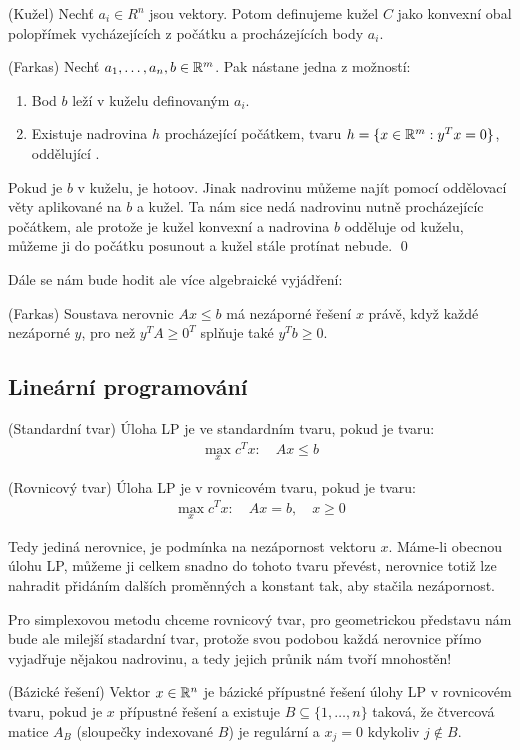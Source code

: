 \df (Kužel) Nechť $a_i\in R^n$ jsou vektory. Potom definujeme kužel $C$ jako
konvexní obal polopřímek vycházejících z počátku a procházejících body $a_i$.

\lm (Farkas) Nechť $a_1, \dots, a_n, b \in \mathbb{R}^m$. Pak nástane jedna z možností:
\begin{enumerate}
	\item Bod $b$ leží v kuželu definovaným $a_i$.
	\item Existuje nadrovina $h$ procházející počátkem, tvaru $h = \{x \in \mathbb{R}^m
	: y^Tx = 0\}$, oddělující .
\end{enumerate}
\dk Pokud je $b$ v kuželu, je hotoov. Jinak nadrovinu můžeme najít pomocí
oddělovací věty aplikované na $b$ a kužel. Ta nám sice nedá nadrovinu nutně
procházejícíc počátkem, ale protože je kužel konvexní a nadrovina $b$ odděluje
od kuželu, můžeme ji do počátku posunout a kužel stále protínat nebude. \qed

Dále se nám bude hodit ale více algebraické vyjádření:

\lm (Farkas) Soustava nerovnic $Ax \leq b$ má nezáporné řešení $x$ právě, když
každé nezáporné $y$, pro než $y^TA \geq 0^T$ splňuje také $y^Tb \geq 0$.

\subsection{Lineární programování}

\df (Standardní tvar) Úloha LP je ve standardním tvaru, pokud je tvaru:
\begin{align}
	\max_x c^Tx : \quad Ax \leq b
\end{align}

\df (Rovnicový tvar) Úloha LP je v rovnicovém tvaru, pokud je tvaru:
\begin{align}
	\max_x c^Tx : \quad Ax = b, \quad x \geq 0
\end{align}

Tedy jediná nerovnice, je podmínka na nezápornost vektoru $x$. Máme-li obecnou
úlohu LP, můžeme ji celkem snadno do tohoto tvaru převést, nerovnice totiž lze
nahradit přidáním dalších proměnných a konstant tak, aby stačila nezápornost.

Pro simplexovou metodu chceme rovnicový tvar, pro geometrickou představu nám
bude ale milejší stadardní tvar, protože svou podobou každá nerovnice přímo
vyjadřuje nějakou nadrovinu, a tedy jejich průnik nám tvoří mnohostěn!

\df (Bázické řešení) Vektor $x \in \mathbb{R}^n$ je bázické přípustné řešení úlohy LP v
rovnicovém tvaru, pokud je $x$ přípustné řešení a existuje $B \subseteq \{1,
\dots, n\}$ taková, že čtvercová matice $A_B$ (sloupečky indexované $B$) je
regulární a $x_j = 0$ kdykoliv $j \notin B$.

